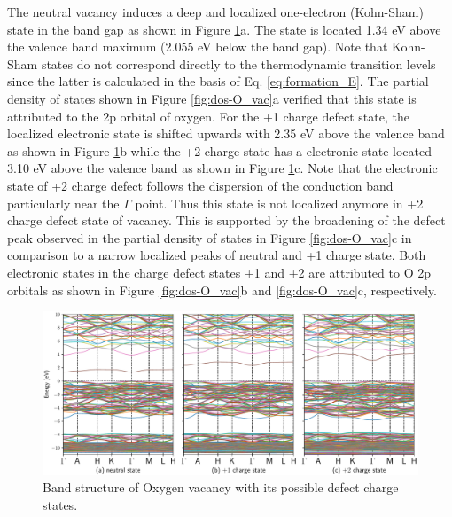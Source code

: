 The neutral  vacancy induces a deep and localized one-electron (Kohn-Sham) state in the band gap as shown in Figure \ref{fig:band-O_vac}a. The state is located 1.34 eV above the valence band maximum (2.055 eV below the band gap). Note that Kohn-Sham states do not correspond directly to the thermodynamic transition levels since the latter is calculated in the basis of Eq. \eqref{eq:formation_E}. The partial density of states shown in Figure \ref{fig:dos-O_vac}a verified that this state is attributed to the 2p orbital of oxygen. For the +1 charge defect state, the localized electronic state is shifted upwards with 2.35 eV above the valence band as shown in Figure  \ref{fig:band-O_vac}b  while the +2 charge state has a electronic state located 3.10 eV above the valence band as shown in Figure \ref{fig:band-O_vac}c. Note that the electronic state of +2 charge defect follows the dispersion of the conduction band particularly near the $\Gamma$ point. Thus this state is not localized anymore in +2 charge defect state of  vacancy. This is supported by the broadening of the defect peak observed in the partial density of states in Figure \ref{fig:dos-O_vac}c in comparison to a narrow localized peaks of neutral and +1 charge state. Both electronic states in the charge defect states +1 and +2 are attributed to O 2p orbitals as shown in Figure \ref{fig:dos-O_vac}b and \ref{fig:dos-O_vac}c, respectively.

\clearpage

\begin{figure}[tbh!]
	\centering
	\includegraphics[width=1\textwidth]{"images/rnd/O_v-band"}
	\caption[Band structure of Oxygen vacancy with its possible defect charge states]{Band structure of Oxygen vacancy with its possible defect charge states. }
	\label{fig:band-O_vac}
\end{figure}

